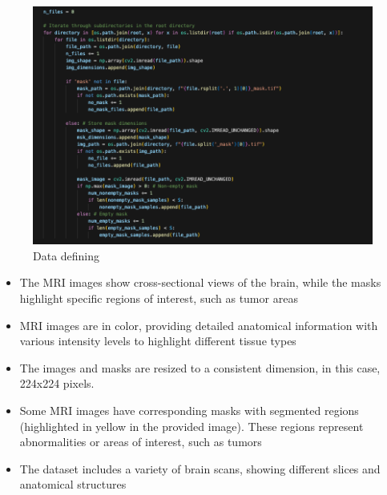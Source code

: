 \documentclass[11pt,a4paper]{article}
\begin{document}
\begin{figure}[H]
    \centering
    \includegraphics[width=\linewidth]{data_def.png}
    \caption{Data defining}
    
\end{figure}
\vspace{1.0cm}
\begin{itemize}
    \item The MRI images show cross-sectional views of the brain, while the masks highlight specific regions of interest, such as tumor areas
    \item MRI images are in color, providing detailed anatomical information with various intensity levels to highlight different tissue types
    \item The images and masks are resized to a consistent dimension, in this case, 224x224 pixels.
    \item Some MRI images have corresponding masks with segmented regions (highlighted in yellow in the provided image). These regions represent abnormalities or areas of interest, such as tumors
    \item The dataset includes a variety of brain scans, showing different slices and anatomical structures
    
\end{itemize}
\end{document}

